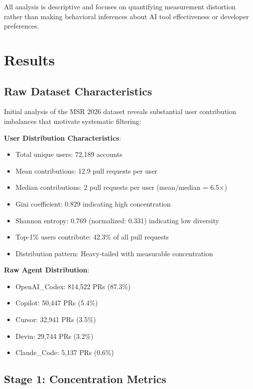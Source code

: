 \documentclass[conference]{IEEEtran}
\begin{document}
All analysis is descriptive and focuses on quantifying measurement distortion rather than making behavioral inferences about AI tool effectiveness or developer preferences.

\section{Results}

\subsection{Raw Dataset Characteristics}

Initial analysis of the MSR 2026 dataset reveals substantial user contribution imbalances that motivate systematic filtering:

\textbf{User Distribution Characteristics}:
\begin{itemize}
    \item Total unique users: 72,189 accounts
    \item Mean contributions: 12.9 pull requests per user
    \item Median contributions: 2 pull requests per user (mean/median = 6.5×)
    \item Gini coefficient: 0.829 indicating high concentration
    \item Shannon entropy: 0.769 (normalized: 0.331) indicating low diversity
    \item Top-1\% users contribute: 42.3\% of all pull requests
    \item Distribution pattern: Heavy-tailed with measurable concentration
\end{itemize}

\textbf{Raw Agent Distribution}:
\begin{itemize}
    \item OpenAI\_Codex: 814,522 PRs (87.3\%)
    \item Copilot: 50,447 PRs (5.4\%)  
    \item Cursor: 32,941 PRs (3.5\%)
    \item Devin: 29,744 PRs (3.2\%)
    \item Claude\_Code: 5,137 PRs (0.6\%)
\end{itemize}

\subsection{Stage 1: Concentration Metrics}
\end{document}
